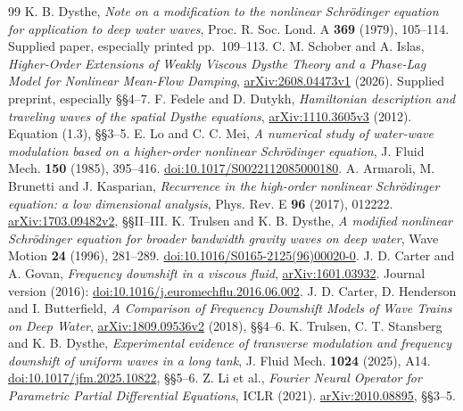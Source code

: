 \begin{thebibliography}{99}
K. B. Dysthe, \emph{Note on a modification to the nonlinear
Schr\"odinger equation for application to deep water waves},
Proc. R. Soc. Lond. A \textbf{369} (1979), 105--114.
Supplied paper, especially printed pp.~109--113.
C. M. Schober and A. Islas,
\emph{Higher-Order Extensions of Weakly Viscous Dysthe Theory and a
Phase-Lag Model for Nonlinear Mean-Flow Damping},
\href{https://arxiv.org/abs/2608.04473v1}{arXiv:2608.04473v1} (2026).
Supplied preprint, especially \S\S4--7.
F. Fedele and D. Dutykh,
\emph{Hamiltonian description and traveling waves of the spatial Dysthe
equations}, \href{https://arxiv.org/abs/1110.3605v3}{arXiv:1110.3605v3}
(2012). Equation (1.3), \S\S3--5.
E. Lo and C. C. Mei,
\emph{A numerical study of water-wave modulation based on a higher-order
nonlinear Schr\"odinger equation}, J. Fluid Mech. \textbf{150} (1985),
395--416.
\href{https://doi.org/10.1017/S0022112085000180}{doi:10.1017/S0022112085000180}.
A. Armaroli, M. Brunetti and J. Kasparian,
\emph{Recurrence in the high-order nonlinear Schr\"odinger equation:
a low dimensional analysis}, Phys. Rev. E \textbf{96} (2017), 012222.
\href{https://arxiv.org/abs/1703.09482v2}{arXiv:1703.09482v2},
\S\S II--III.
K. Trulsen and K. B. Dysthe,
\emph{A modified nonlinear Schr\"odinger equation for broader bandwidth
gravity waves on deep water}, Wave Motion \textbf{24} (1996), 281--289.
\href{https://doi.org/10.1016/S0165-2125(96)00020-0}{doi:10.1016/S0165-2125(96)00020-0}.
J. D. Carter and A. Govan,
\emph{Frequency downshift in a viscous fluid},
\href{https://arxiv.org/abs/1601.03932}{arXiv:1601.03932}.
Journal version (2016):
\href{https://doi.org/10.1016/j.euromechflu.2016.06.002}{doi:10.1016/j.euromechflu.2016.06.002}.
J. D. Carter, D. Henderson and I. Butterfield,
\emph{A Comparison of Frequency Downshift Models of Wave Trains on Deep Water},
\href{https://arxiv.org/abs/1809.09536v2}{arXiv:1809.09536v2} (2018),
\S\S4--6.
K. Trulsen, C. T. Stansberg and K. B. Dysthe,
\emph{Experimental evidence of transverse modulation and frequency
downshift of uniform waves in a long tank},
J. Fluid Mech. \textbf{1024} (2025), A14.
\href{https://doi.org/10.1017/jfm.2025.10822}{doi:10.1017/jfm.2025.10822},
\S\S5--6.
Z. Li et al.,
\emph{Fourier Neural Operator for Parametric Partial Differential Equations},
ICLR (2021).
\href{https://arxiv.org/abs/2010.08895}{arXiv:2010.08895}, \S\S3--5.

\end{thebibliography}

